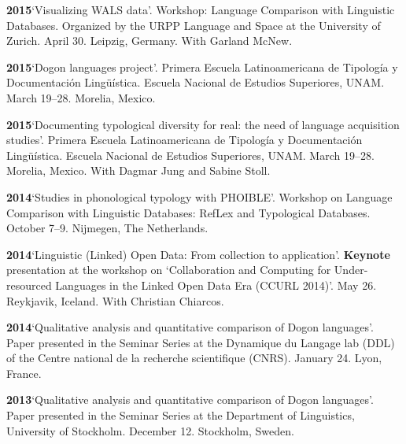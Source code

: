 \documentclass[11pt]{article}
\newcommand{\hangpara}{
 \setlength{\parindent}{0in} %
 \hangindent=0.42in %
}
\begin{document}
\vskip 6pt
\hangpara
{\bf 2015}\hspace{1ex}`Visualizing WALS data'. Workshop: Language Comparison with Linguistic Databases. Organized by the URPP Language and Space at the University of Zurich. April 30. Leipzig, Germany. With Garland McNew.


\vskip 6pt
\hangpara
{\bf 2015}\hspace{1ex}`Dogon languages project'. Primera Escuela Latinoamericana de Tipolog{\'i}a y Documentaci{\'o}n Ling{\"u}{\'i}stica. Escuela Nacional de Estudios Superiores, UNAM. March 19--28. Morelia, Mexico.

\vskip 6pt
\hangpara
{\bf 2015}\hspace{1ex}`Documenting typological diversity for real: the need of language acquisition studies'.  Primera Escuela Latinoamericana de Tipolog{\'i}a y Documentaci{\'o}n Ling{\"u}{\'i}stica. Escuela Nacional de Estudios Superiores, UNAM. March 19--28. Morelia, Mexico. With Dagmar Jung and Sabine Stoll.

\vskip 6pt
\hangpara
{\bf 2014}\hspace{1ex}`Studies in phonological typology with PHOIBLE'. Workshop on Language Comparison with Linguistic Databases: RefLex and Typological Databases. October 7--9. Nijmegen, The Netherlands.

\vskip 6pt
\hangpara
{\bf 2014}\hspace{1ex}`Linguistic (Linked) Open Data: From collection to application'. \textbf{Keynote} presentation at the workshop on `Collaboration and Computing for Under-resourced Languages in the Linked Open Data Era (CCURL 2014)'. May 26. Reykjavik, Iceland. With Christian Chiarcos.

\vskip 6pt
\hangpara
{\bf 2014}\hspace{1ex}`Qualitative analysis and quantitative comparison of Dogon languages'. Paper presented in the Seminar Series at the Dynamique du Langage lab (DDL) of the Centre national de la recherche scientifique (CNRS). January 24. Lyon, France.

\vskip 6pt
\hangpara
{\bf 2013}\hspace{1ex}`Qualitative analysis and quantitative comparison of Dogon languages'. Paper presented in the Seminar Series at the Department of Linguistics, University of Stockholm. December 12. Stockholm, Sweden.
\end{document}
